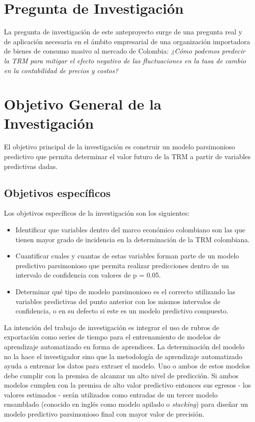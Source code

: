 \section{Pregunta de Investigación}
La pregunta de investigación de este anteproyecto surge de una pregunta real y de aplicación necesaria en el ámbito empresarial de una organización importadora de bienes de consumo masivo al mercado de Colombia: \emph{¿Cómo podemos predecir la TRM para mitigar el efecto negativo de las fluctuaciones en la tasa de cambio en la contabilidad de precios y costos?}

\section{Objetivo General de la Investigación}
El objetivo principal de la investigación es construir un modelo parsimonioso predictivo que permita determinar el valor futuro de la TRM a partir de variables predictivas dadas.

\subsection{Objetivos específicos}
Los objetivos específicos de la investigación son los siguientes:

\begin{itemize}
	\item Identificar que variables dentro del marco económico colombiano son las que tienen mayor grado de incidencia en la determinación de la TRM colombiana.
	\item Cuantificar cuales y cuantas de estas variables forman parte de un modelo predictivo parsimonioso que permita realizar predicciones dentro de un intervalo de confidencia con valores de p = 0.05.
	\item Determinar qué tipo de modelo parsimonioso es el correcto utilizando las variables predictivas del punto anterior con los mismos intervalos de confidencia, o en su defecto si este es un modelo predictivo compuesto.
\end{itemize}

La intención del trabajo de investigación es integrar el uso de rubros de exportación como series de tiempo para el entrenamiento de modelos de aprendizaje automatizado en forma de aprendices. La determinación del modelo no la hace el investigador sino que la metodología de aprendizaje automatizado ayuda a entrenar los datos para extraer el modelo. Uno o ambos de estos modelos debe cumplir con la premisa de alcanzar un alto nivel de predicción. Si ambos modelos cumplen con la premisa de alto valor predictivo entonces sus egresos - los valores estimados - serán utilizados como entradas de un tercer modelo ensamblado (conocido en inglés como modelo apilado o \textit{stacking}) para diseñar un modelo predictivo parsimonioso final con mayor valor de precisión.

